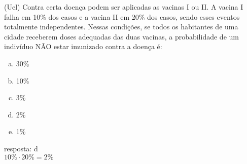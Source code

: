 \begin{ex}
(Uel) Contra certa doença podem ser aplicadas as vacinas I ou II. A vacina I falha em 10\% dos casos e a vacina II em 20\% dos casos, sendo esses eventos totalmente independentes. Nessas condições, se todos os habitantes de uma cidade receberem doses adequadas das duas vacinas, a probabilidade de um indivíduo NÃO estar imunizado contra a doença é:
   \begin{enumerate}[(a)]
   \item 30\%
   \item 10\%
   \item 3\%
   \item 2\%
   \item 1\%
   \end{enumerate}
     \begin{sol}
      resposta: d \\
      $10\% \cdot 20\% = 2\%$
     \end{sol}
\end{ex}